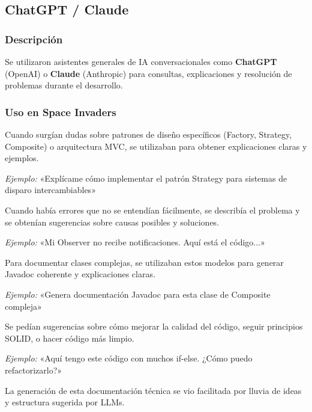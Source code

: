 \documentclass[12pt, a4paper]{article}
\begin{document}
\subsection{ChatGPT / Claude}

\subsubsection{Descripción}

Se utilizaron asistentes generales de IA conversacionales como \textbf{ChatGPT} (OpenAI) o \textbf{Claude} (Anthropic) para consultas, explicaciones y resolución de problemas durante el desarrollo.

\subsubsection{Uso en Space Invaders}

\begin{description}[leftmargin=2em, style=nextline]
    \item[\textbf{Explicación de Conceptos}]
        Cuando surgían dudas sobre patrones de diseño específicos (Factory, Strategy, Composite) o arquitectura MVC, se utilizaban para obtener explicaciones claras y ejemplos.
    
        \textit{Ejemplo:} «Explícame cómo implementar el patrón Strategy para sistemas de disparo intercambiables»
    
    \item[\textbf{Debugging y Resolución de Problemas}]
        Cuando había errores que no se entendían fácilmente, se describía el problema y se obtenían sugerencias sobre causas posibles y soluciones.
    
        \textit{Ejemplo:} «Mi Observer no recibe notificaciones. Aquí está el código...»
    
    \item[\textbf{Generación de Documentación}]
        Para documentar clases complejas, se utilizaban estos modelos para generar Javadoc coherente y explicaciones claras.
    
        \textit{Ejemplo:} «Genera documentación Javadoc para esta clase de Composite compleja»
    
    \item[\textbf{Refactorización}]
        Se pedían sugerencias sobre cómo mejorar la calidad del código, seguir principios SOLID, o hacer código más limpio.
    
        \textit{Ejemplo:} «Aquí tengo este código con muchos if-else. ¿Cómo puedo refactorizarlo?»
    
    \item[\textbf{Escritura de Documentos}]
        La generación de esta documentación técnica se vio facilitada por lluvia de ideas y estructura sugerida por LLMs.
\end{description}
\end{document}

